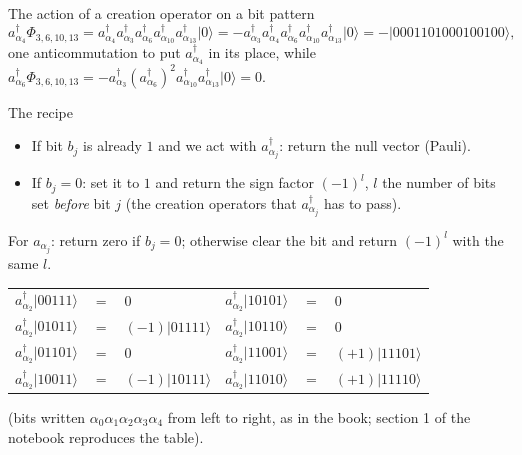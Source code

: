 \documentclass[aspectratio=169,10pt]{beamer}
\newcommand{\ket}[1]{\vert #1\rangle}
\begin{document}
\begin{frame}{The action of a creation operator on a bit pattern}
  \small\vspace{-0.2em}
  \[
    a^{\dagger}_{\alpha_4}\Phi_{3,6,10,13}
    =a^{\dagger}_{\alpha_4}a_{\alpha_3}^{\dagger}a_{\alpha_6}^{\dagger}a_{\alpha_{10}}^{\dagger}a_{\alpha_{13}}^{\dagger}\ket{0}
    =-a_{\alpha_3}^{\dagger}a^{\dagger}_{\alpha_4}a_{\alpha_6}^{\dagger}a_{\alpha_{10}}^{\dagger}a_{\alpha_{13}}^{\dagger}\ket{0}
    =-\ket{0001101000100100},
  \]
  one anticommutation to put $a_{\alpha_4}^{\dagger}$ in its place, while
  $a^{\dagger}_{\alpha_6}\Phi_{3,6,10,13}=-a_{\alpha_3}^{\dagger}(a_{\alpha_6}^{\dagger})^2a_{\alpha_{10}}^{\dagger}a_{\alpha_{13}}^{\dagger}\ket{0}=0$.
  \begin{block}{The recipe}
    \begin{itemize}
      \item If bit $b_j$ is already $1$ and we act with $a^{\dagger}_{\alpha_j}$: return the null vector (Pauli).
      \item If $b_j=0$: set it to $1$ and return the sign factor $(-1)^{l}$, $l$ the number of bits set \emph{before} bit $j$ (the creation operators that $a^{\dagger}_{\alpha_j}$ has to pass).
    \end{itemize}
    For $a_{\alpha_j}$: return zero if $b_j=0$; otherwise clear the bit and return $(-1)^{l}$ with the same $l$.
  \end{block}
  \begin{center}\footnotesize
  \renewcommand{\arraystretch}{1.0}
  \begin{tabular}{lll@{\qquad}lll}
    $a^{\dagger}_{\alpha_2}\ket{00111}$ & $=$ & $0$ &
    $a^{\dagger}_{\alpha_2}\ket{10101}$ & $=$ & $0$\\
    $a^{\dagger}_{\alpha_2}\ket{01011}$ & $=$ & $(-1)\ket{01111}$ &
    $a^{\dagger}_{\alpha_2}\ket{10110}$ & $=$ & $0$\\
    $a^{\dagger}_{\alpha_2}\ket{01101}$ & $=$ & $0$ &
    $a^{\dagger}_{\alpha_2}\ket{11001}$ & $=$ & $(+1)\ket{11101}$\\
    $a^{\dagger}_{\alpha_2}\ket{10011}$ & $=$ & $(-1)\ket{10111}$ &
    $a^{\dagger}_{\alpha_2}\ket{11010}$ & $=$ & $(+1)\ket{11110}$\\
  \end{tabular}
  \end{center}
  (bits written $\alpha_0\alpha_1\alpha_2\alpha_3\alpha_4$ from left to right, as in the book; section 1 of the notebook reproduces the table).
\end{frame}
\end{document}
